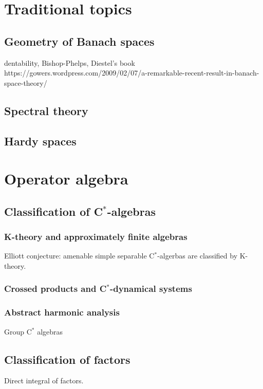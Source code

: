 \documentclass[12pt]{report}
\begin{document}
\tableofcontents

\part{Traditional topics}
\chapter{Geometry of Banach spaces}
dentability, Bishop-Phelps, Diestel's book
https://gowers.wordpress.com/2009/02/07/a-remarkable-recent-result-in-banach-space-theory/
\chapter{Spectral theory}
\chapter{Hardy spaces}











\part{Operator algebra}

\chapter{Classification of C$^*$-algebras}

\section{K-theory and approximately finite algebras}
Elliott conjecture: amenable simple separable C$^*$-algerbas are classified by K-theory.
\section{Crossed products and C$^*$-dynamical systems}
\section{Abstract harmonic analysis}
Group C$^*$ algebras






\chapter{Classification of factors}
Direct integral of factors.
\end{document}
